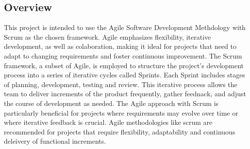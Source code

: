 \documentclass[a4paper,12pt]{article}  %
\begin{document}
\subsection{Overview}
This project is intended to use the Agile Software Development Methdology with
Scrum as the chosen framework. Agile emphasizes flexibility, iterative
development, as well as colaboration, making it ideal for projects that need to
adapt to changing requirements and foster continuous improvement. The Scrum
framework, a subset of Agile, is employed to structure the project’s
development process into a series of iterative cycles called Sprints. Each
Sprint includes stages of planning, development, testing and review. This
iterative process allows the team to deliver increments of the product
frequently, gather feednack, and adjust the course of development as needed.
The Agile approach with Scrum is particularly beneficial for projects where
requirements may evolve over time or where iterative feedback is crucial. Agile
methodologies like scrum are recommended for projects that require flexibility,
adaptability and continuous deleivery of functional increments.
\cite{schwaber2020scrum}\\
\end{document}
